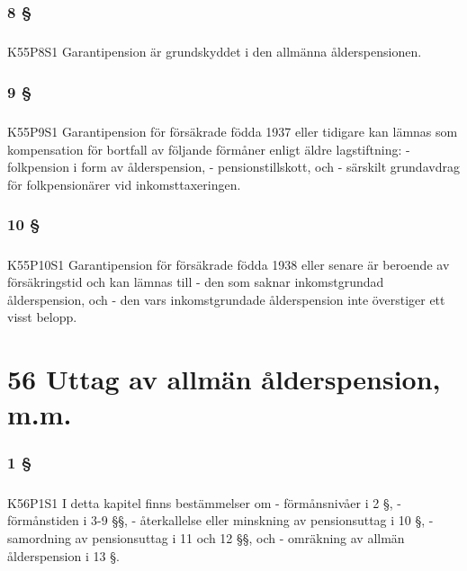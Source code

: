 \documentclass[a4paper,notitlepage,openany,10pt]{book}
\begin{document}
\subsection*{8 §}
\paragraph*{}
{\tiny K55P8S1}
Garantipension är grundskyddet i den allmänna ålderspensionen.
\subsection*{9 §}
\paragraph*{}
{\tiny K55P9S1}
Garantipension för försäkrade födda 1937 eller tidigare kan lämnas som kompensation för bortfall av följande förmåner enligt äldre lagstiftning:
\newline - folkpension i form av ålderspension,
\newline - pensionstillskott, och
\newline - särskilt grundavdrag för folkpensionärer vid inkomsttaxeringen.
\subsection*{10 §}
\paragraph*{}
{\tiny K55P10S1}
Garantipension för försäkrade födda 1938 eller senare är beroende av försäkringstid och kan lämnas till
\newline - den som saknar inkomstgrundad ålderspension, och
\newline - den vars inkomstgrundade ålderspension inte överstiger ett visst belopp.
\chapter*{56 Uttag av allmän ålderspension, m.m.}
\subsection*{1 §}
\paragraph*{}
{\tiny K56P1S1}
I detta kapitel finns bestämmelser om
\newline - förmånsnivåer i 2 §,
\newline - förmånstiden i 3-9 §§,
\newline - återkallelse eller minskning av pensionsuttag i 10 §,
\newline - samordning av pensionsuttag i 11 och 12 §§, och
\newline - omräkning av allmän ålderspension i 13 §.
\end{document}
